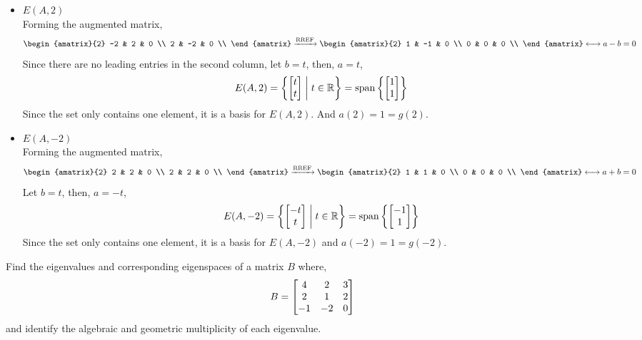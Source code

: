 \begin{itemize}
    \item $E(A, 2)$ \\
    Forming the augmented matrix,
    $$\begin{amatrix}{2}
        -2 & 2 & 0 \\
        2 & -2 & 0 \\
    \end{amatrix} \xrightarrow{\text{RREF}}
    \begin{amatrix}{2}
        1 & -1 & 0 \\
        0 & 0 & 0 \\
    \end{amatrix} \longleftrightarrow
    a - b = 0
    $$
    Since there are no leading entries in the second column, let $b = t$, then, $a = t$,
    $$E(A, 2) = \left\{\bmat{t \\ t} \suchthat t \in \RR\right\} = \spn\left\{\bmat{1 \\ 1}\right\}$$
    Since the set only contains one element, it is a basis for $E(A, 2)$. And $a(2) = 1 = g(2)$.

    \item $E(A, -2)$ \\
    Forming the augmented matrix,
    $$\begin{amatrix}{2}
        2 & 2 & 0 \\
        2 & 2 & 0 \\
    \end{amatrix} \xrightarrow{\text{RREF}}
    \begin{amatrix}{2}
        1 & 1 & 0 \\
        0 & 0 & 0 \\
    \end{amatrix} \longleftrightarrow a + b = 0
    $$
    Let $b = t$, then, $a = -t$,
    $$E(A, -2) = \left\{\bmat{-t \\ t} \suchthat t \in \RR\right\} = \spn\left\{\bmat{-1 \\ 1}\right\}$$
    Since the set only contains one element, it is a basis for $E(A, -2)$ and $a(-2) = 1 = g(-2)$.
\end{itemize}

\begin{example}
Find the eigenvalues and corresponding eigenspaces of a matrix $B$ where, 
$$B = \begin{bmatrix} 4 & 2 & 3 \\ 2 & 1 & 2 \\ -1 & -2 & 0 \end{bmatrix}$$
and identify the algebraic and geometric multiplicity of each eigenvalue.
\end{example}

